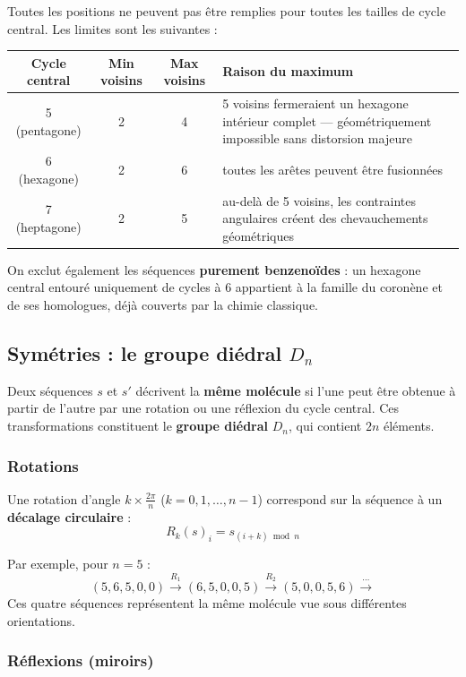 \documentclass[a4paper,12pt]{article}
\begin{document}
Toutes les positions ne peuvent pas être remplies pour toutes les tailles de cycle central.
Les limites sont les suivantes :

\begin{center}
\begin{tabular}{cccp{7cm}}
  \toprule
  Cycle central & Min voisins & Max voisins & Raison du maximum \\
  \midrule
  5 (pentagone)  & 2 & 4 & 5 voisins fermeraient un hexagone intérieur complet — géométriquement impossible sans distorsion majeure \\
  6 (hexagone)   & 2 & 6 & toutes les arêtes peuvent être fusionnées \\
  7 (heptagone)  & 2 & 5 & au-delà de 5 voisins, les contraintes angulaires créent des chevauchements géométriques \\
  \bottomrule
\end{tabular}
\end{center}

On exclut également les séquences \textbf{purement benzenoïdes} : un hexagone central entouré
uniquement de cycles à 6 appartient à la famille du coronène et de ses homologues, déjà couverts
par la chimie classique.

\subsection{Symétries : le groupe diédral $D_n$}

Deux séquences $s$ et $s'$ décrivent la \textbf{même molécule} si l'une peut être obtenue à
partir de l'autre par une rotation ou une réflexion du cycle central. Ces transformations
constituent le \textbf{groupe diédral} $D_n$, qui contient $2n$ éléments.

\subsubsection{Rotations}

Une rotation d'angle $k \times \frac{2\pi}{n}$ ($k = 0, 1, \ldots, n-1$) correspond sur la
séquence à un \textbf{décalage circulaire} :
\[
  R_k(s)_i = s_{(i+k) \bmod n}
\]

Par exemple, pour $n = 5$ :
\[
  (5, 6, 5, 0, 0) \xrightarrow{R_1} (6, 5, 0, 0, 5) \xrightarrow{R_2} (5, 0, 0, 5, 6) \xrightarrow{\cdots}
\]
Ces quatre séquences représentent la même molécule vue sous différentes orientations.

\subsubsection{Réflexions (miroirs)}
\end{document}
